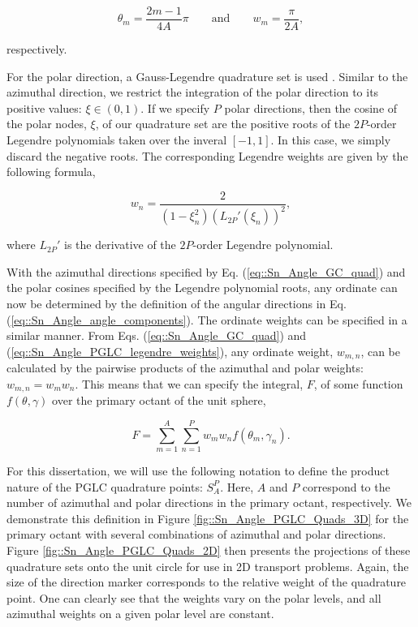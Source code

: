 \begin{equation}
\label{eq::Sn_Angle_GC_quad}
\theta_m = \frac{2m - 1}{4A} \pi \qquad \text{and} \qquad w_m = \frac{\pi}{2 A} ,
\end{equation}

\noindent respectively. 

For the polar direction, a Gauss-Legendre quadrature set is used \cite{abramowitz1964handbook}. Similar to the azimuthal direction, we restrict the integration of the polar direction to its positive values: $\xi \in (0,1)$. If we specify $P$ polar directions, then the cosine of the polar nodes, $\xi$, of our quadrature set are the positive roots of the $2P$-order Legendre polynomials taken over the inveral $[-1, 1]$. In this case, we simply discard the negative roots. The corresponding Legendre weights are given by the following formula,

\begin{equation}
\label{eq::Sn_Angle_PGLC_legendre_weights}
w_n = \frac{2}{(1-\xi_n^2) (L_{2P}' (\xi_n))^2} ,
\end{equation}

\noindent where $ L_{2P}'$ is the derivative of the $2P$-order Legendre polynomial.

With the azimuthal directions specified by Eq. (\ref{eq::Sn_Angle_GC_quad}) and the polar cosines specified by the Legendre polynomial roots, any ordinate can now be determined by the definition of the angular directions in Eq. (\ref{eq::Sn_Angle_angle_components}). The ordinate weights can be specified in a similar manner. From Eqs. (\ref{eq::Sn_Angle_GC_quad}) and (\ref{eq::Sn_Angle_PGLC_legendre_weights}), any ordinate weight, $w_{m,n}$, can be calculated by the pairwise products of the azimuthal and polar weights: $w_{m,n} = w_m w_n$. This means that we can specify the integral, $F$, of some function $f (\theta, \gamma)$ over the primary octant of the unit sphere,

\begin{equation}
\label{eq::Sn_Angle_PGLC_product_weights}
F = \sum_{m=1}^{A} \sum_{n=1}^{P} w_m w_n  f(\theta_m , \gamma_n).
\end{equation}

For this dissertation, we will use the following notation to define the product nature of the PGLC quadrature points: $S_{A}^{P}$. Here, $A$ and $P$ correspond to the number of azimuthal and polar directions in the primary octant, respectively. We demonstrate this definition in Figure \ref{fig::Sn_Angle_PGLC_Quads_3D} for the primary octant with several combinations of azimuthal and polar directions. Figure \ref{fig::Sn_Angle_PGLC_Quads_2D} then presents the projections of these quadrature sets onto the unit circle for use in 2D transport problems. Again, the size of the direction marker corresponds to the relative weight of the quadrature point. One can clearly see that the weights vary on the polar levels, and all azimuthal weights on a given polar level are constant.

